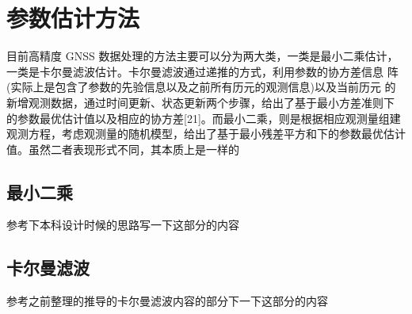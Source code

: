 \section{参数估计方法}
目前高精度 GNSS 数据处理的方法主要可以分为两大类，一类是最小二乘估计，一类是卡尔曼滤波估计。卡尔曼滤波通过递推的方式，利用参数的协方差信息 阵(实际上是包含了参数的先验信息以及之前所有历元的观测信息)以及当前历元 的新增观测数据，通过时间更新、状态更新两个步骤，给出了基于最小方差准则下 的参数最优估计值以及相应的协方差[21]。而最小二乘，则是根据相应观测量组建 观测方程，考虑观测量的随机模型，给出了基于最小残差平方和下的参数最优估计 值。虽然二者表现形式不同，其本质上是一样的
\subsection{最小二乘}

参考下本科设计时候的思路写一下这部分的内容

\subsection{卡尔曼滤波}

参考之前整理的推导的卡尔曼滤波内容的部分下一下这部分的内容
